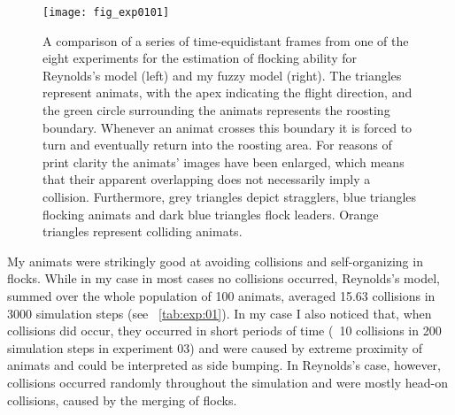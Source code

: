 \begin{figure}[p]
  \null\vspace*{1mm}
  \texttt{[image: fig\_exp0101]}
  \par\vspace*{1mm}
  \caption{A comparison of a series of time-equidistant frames from one of the eight experiments for the estimation of flocking ability for Reynolds's model \cite{reynolds:1999} (left) and my fuzzy model (right). The triangles represent animats, with the apex indicating the flight direction, and the green circle surrounding the animats represents the roosting boundary. Whenever an animat crosses this boundary it is forced to turn and eventually return into the roosting area. For reasons of print clarity the animats' images have been enlarged, which means that their apparent overlapping does not necessarily imply a collision. Furthermore, grey triangles depict stragglers, blue triangles flocking animats and dark blue triangles flock leaders. Orange triangles represent colliding animats.}
  \label{fig:exp:01:01}
\end{figure}
\afterpage{\clearpage}

My animats were strikingly good at avoiding collisions and self-organizing in flocks. While in my case in most cases no collisions occurred, Reynolds's model, summed over the whole population of 100 animats, averaged 15.63 collisions in 3000 simulation steps (see \tab~\ref{tab:exp:01}). In my case I also noticed that, when collisions did occur, they occurred in short periods of time (\eg\ 10 collisions in 200 simulation steps in experiment 03) and were caused by extreme proximity of animats and could be interpreted as side bumping. In Reynolds's case, however, collisions occurred randomly throughout the simulation and were mostly head-on collisions, caused by the merging of flocks.

